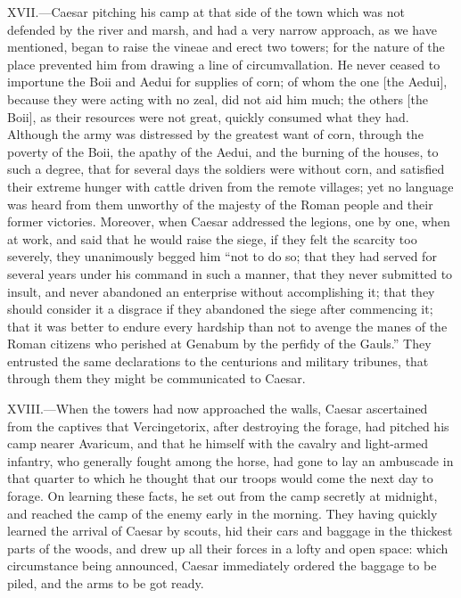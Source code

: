 XVII.—Caesar pitching his camp at that side of the town which was not
defended by the river and marsh, and had a very narrow approach, as we
have mentioned, began to raise the vineae and erect two towers; for the
nature of the place prevented him from drawing a line of
circumvallation. He never ceased to importune the Boii and Aedui for
supplies of corn; of whom the one [the Aedui], because they were acting
with no zeal, did not aid him much; the others [the Boii], as their
resources were not great, quickly consumed what they had. Although the
army was distressed by the greatest want of corn, through the poverty of
the Boii, the apathy of the Aedui, and the burning of the houses, to
such a degree, that for several days the soldiers were without corn, and
satisfied their extreme hunger with cattle driven from the remote
villages; yet no language was heard from them unworthy of the majesty of
the Roman people and their former victories. Moreover, when Caesar
addressed the legions, one by one, when at work, and said that he would
raise the siege, if they felt the scarcity too severely, they
unanimously begged him ``not to do so; that they had served for several
years under his command in such a manner, that they never submitted to
insult, and never abandoned an enterprise without accomplishing it; that
they should consider it a disgrace if they abandoned the siege after
commencing it; that it was better to endure every hardship than not to
avenge the manes of the Roman citizens who perished at Genabum by the
perfidy of the Gauls.'' They entrusted the same declarations to the
centurions and military tribunes, that through them they might be
communicated to Caesar.

XVIII.—When the towers had now approached the walls, Caesar ascertained
from the captives that Vercingetorix, after destroying the forage, had
pitched his camp nearer Avaricum, and that he himself with the cavalry
and light-armed infantry, who generally fought among the horse, had gone
to lay an ambuscade in that quarter to which he thought that our troops
would come the next day to forage. On learning these facts, he set out
from the camp secretly at midnight, and reached the camp of the enemy
early in the morning. They having quickly learned the arrival of Caesar
by scouts, hid their cars and baggage in the thickest parts of the
woods, and drew up all their forces in a lofty and open space: which
circumstance being announced, Caesar immediately ordered the baggage to
be piled, and the arms to be got ready.

